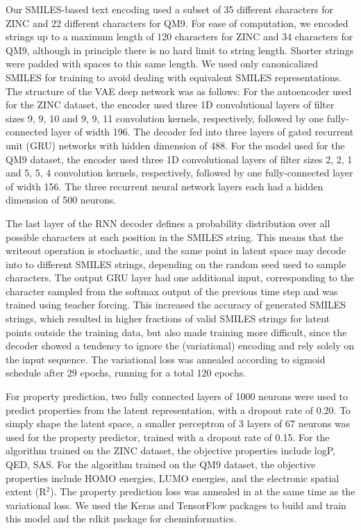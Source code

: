 Our SMILES-based text encoding used a subset of 35 different characters for ZINC and 22 different characters for QM9.
For ease of computation, we encoded strings up to a maximum length of 120 characters for ZINC and 34 characters for QM9, although in principle there is no hard limit to string length. Shorter strings were padded with spaces to this same length. We used only canonicalized SMILES for training to avoid dealing with equivalent SMILES representations.
The structure of the VAE deep network was as follows: For the autoencoder used for the ZINC dataset, the encoder used three 1D convolutional layers of filter sizes 9, 9, 10 and 9, 9, 11 convolution kernels, respectively, followed by one fully-connected layer of width 196. The decoder fed into three layers of gated recurrent unit (GRU) networks\cite{chung_2014_empirical} with hidden dimension of 488. %
For the model used for the QM9 dataset, the encoder used three 1D convolutional layers of filter sizes 2, 2, 1 and 5, 5, 4 convolution kernels, respectively, followed by one fully-connected layer of width 156. The three recurrent neural network layers each had a hidden dimension of 500 neurons.

The last layer of the RNN decoder defines a probability distribution over all possible characters at each position in the SMILES string.
This means that the writeout operation is stochastic, and the same point in latent space may decode into to different SMILES strings, depending on the random seed used to sample characters.
The output GRU layer had one additional input, corresponding to the character sampled from the softmax output of the previous time step and was trained using teacher forcing.\cite{williams_1989} This increased the accuracy of generated SMILES strings, which resulted in higher fractions of valid SMILES strings for latent points outside the training data, but also made training more difficult, since the decoder showed a tendency to ignore the (variational) encoding and rely solely on the input sequence. The variational loss was annealed according to sigmoid schedule after 29 epochs, running for a total 120 epochs.

For property prediction, two fully connected layers of 1000 neurons were used to predict properties from the latent representation, with a dropout rate of 0.20. To simply shape the latent space, a smaller perceptron of 3 layers of 67 neurons was used for the property predictor, trained with a dropout rate of 0.15. For the algorithm trained on the ZINC dataset, the objective properties include logP, QED, SAS. For the algorithm trained on the QM9 dataset, the objective properties include HOMO energies, LUMO energies, and the electronic spatial extent (R$^2$). The property prediction loss was annealed in at the same time as the variational loss.
We used the Keras\cite{chollet_2015} and TensorFlow\cite{Tensorflow-2016} packages to build and train this model and the rdkit package for cheminformatics\cite{rdkit}. 


